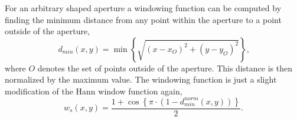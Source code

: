 For an arbitrary shaped aperture a windowing function can be computed by finding the minimum distance from any point within the aperture to a point outside of the aperture,
\begin{equation}
  d_{min}(x,y) = \min\left\{\sqrt{(x-x_{O})^2+(y-y_{O})^2}\right\} \textrm{,}
\end{equation}
where $O$ denotes the set of points outside of the aperture.
This distance is then normalized by the maximum value.
The windowing function is just a slight modification of the Hann window function again,
\begin{equation}
  w_s(x,y) = \frac{1+\cos\left\{\pi\cdot\left(1-d_{min}^{norm}(x,y)\right)\right\}}{2} \textrm{.}
\end{equation}


